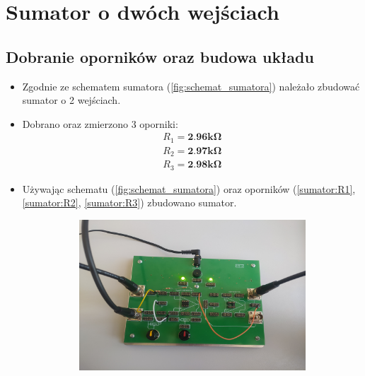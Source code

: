 \chapter{Sumator o dwóch wejściach}



\section{Dobranie oporników oraz budowa układu}

\begin{itemize}
    \item Zgodnie ze schematem sumatora (\ref{fig:schemat_sumatora}) należało zbudować sumator o 2 wejściach.
    \item Dobrano oraz zmierzono 3 oporniki:
        \begin{gather}
            \label{sumator:R1} R_1 = \textbf{2.96k}\boldsymbol{\Omega} \\
            \label{sumator:R2} R_2 = \textbf{2.97k}\boldsymbol{\Omega} \\
            \label{sumator:R3} R_3 = \textbf{2.98k}\boldsymbol{\Omega} 
        \end{gather}
    \item Używając schematu (\ref{fig:schemat_sumatora}) oraz oporników (\ref{sumator:R1}, \ref{sumator:R2}, \ref{sumator:R3}) zbudowano sumator. 
        \begin{figure}[H]
        \centering
        \begin{subfigure}[h]{0.4\textwidth}
            \includegraphics[width=\textwidth]{img/phone/1651502036847_scaled.png}
        \end{subfigure}
        \begin{subfigure}[h]{0.4\textwidth}

\end{subfigure}
\end{figure}
\end{itemize}

